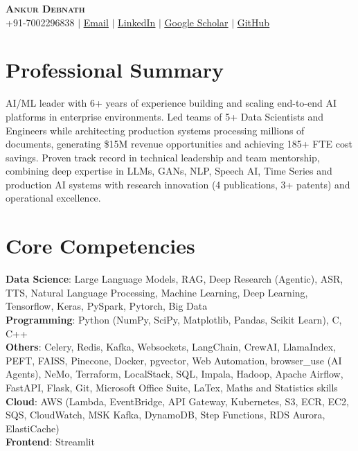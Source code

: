 \documentclass[letterpaper,11pt]{article}
\begin{document}
\begin{center}
    \textbf{\Huge \scshape Ankur Debnath} \\ \vspace{1pt}
    \small +91-7002296838 $|$ \href{mailto:ankurdebnath35@gmail.com}{\underline{Email}} $|$ 
    \href{https://linkedin.com/in/ankur-debnath-b0b694104}{\underline{LinkedIn}} $|$
    \href{https://scholar.google.com/citations?hl=en\&user=9\_SZhIYAAAAJ}{\underline{Google Scholar}} $|$
    \href{https://github.com/AnkurDebnath35}{\underline{GitHub}}    
\end{center}

\section{\textbf{Professional Summary}}
\small{AI/ML leader with 6+ years of experience building and scaling end-to-end AI platforms in enterprise environments. Led teams of 5+ Data Scientists and Engineers while architecting production systems processing millions of documents, generating \$15M revenue opportunities and achieving 185+ FTE cost savings. Proven track record in technical leadership and team mentorship, combining deep expertise in LLMs, GANs, NLP, Speech AI, Time Series and production AI systems with research innovation (4 publications, 3+ patents) and operational excellence.}

\section{\textbf{Core Competencies}}
 \begin{itemize}[leftmargin=0.15in, label={}]
    \small{\item{
     \textbf{Data Science}{: Large Language Models, RAG, Deep Research (Agentic), ASR, TTS, Natural Language Processing, Machine Learning, Deep Learning, Tensorflow, Keras, PySpark, Pytorch, Big Data} \\
     \textbf{Programming}{: Python (NumPy, SciPy, Matplotlib, Pandas, Scikit Learn), C, C++} \\
    \textbf{Others}{: Celery, Redis, Kafka, Websockets, LangChain, CrewAI, LlamaIndex, PEFT, FAISS, Pinecone, Docker, pgvector, Web Automation, browser\_use (AI Agents), NeMo, Terraform, LocalStack, SQL, Impala, Hadoop, Apache Airflow, FastAPI, Flask, Git, Microsoft Office Suite, LaTex, Maths and Statistics skills} \\
    \textbf{Cloud}{: AWS (Lambda, EventBridge, API Gateway, Kubernetes, S3, ECR, EC2, SQS, CloudWatch, MSK Kafka, DynamoDB, Step Functions, RDS Aurora, ElastiCache)} \\
     \textbf{Frontend}{:  Streamlit}

    }}
 \end{itemize}
\end{document}
